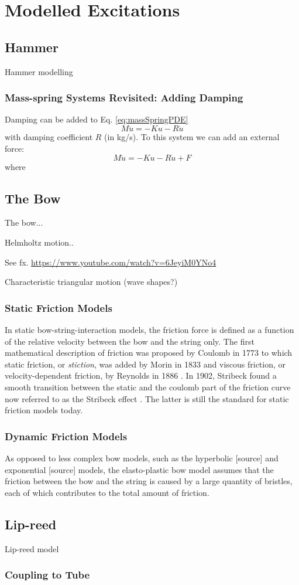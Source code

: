 \chapter{Modelled Excitations}\label{ch:bowModels}

\section{Hammer}
Hammer modelling

\subsection{Mass-spring Systems Revisited: Adding Damping}

Damping can be added to Eq. \eqref{eq:massSpringPDE}  
\begin{equation}
    M\ddot u = -Ku - R\dot u
\end{equation}
with damping coefficient $R$ (in kg/s). To this system we can add an external force:
\begin{equation}
    M\ddot u = -Ku - R\dot u + F
\end{equation}
where 
\section{The Bow}
The bow...

Helmholtz motion..

See fx. \url{https://www.youtube.com/watch?v=6JeyiM0YNo4}

Characteristic triangular motion (wave shapes?)

\subsection{Static Friction Models}
In static bow-string-interaction models, the friction force is defined as a function of the relative velocity between the bow and the string only.
The first mathematical description of friction was proposed by Coulomb in 1773 \cite{Coulomb} to which static friction, or \textit{stiction}, was added by Morin in 1833 \cite{Morin1833} and viscous friction, or velocity-dependent friction, by Reynolds in 1886 \cite{Reynolds1886}. In 1902, Stribeck found a smooth transition between the static and the coulomb part of the friction curve now referred to as the Stribeck effect \cite{Stribeck1902}. The latter is still the standard for static friction models today.

\subsection{Dynamic Friction Models}
As opposed to less complex bow models, such as the hyperbolic [source] and exponential [source] models, the elasto-plastic bow model assumes that the friction between the bow and the string is caused by a large quantity of bristles, each of which contributes to the total amount of friction.

\section{Lip-reed}
Lip-reed model


\subsection{Coupling to Tube}
